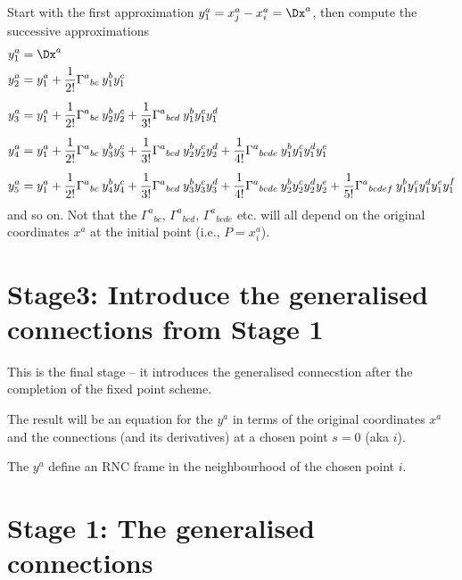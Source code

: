 \documentclass[12pt]{cdblatex}
\begin{document}
Start with the first approximation $y^a_1 = x^a_j-x^a_i = \Dx^a$, then compute the successive approximations
\begin{align*}
   y^a_1 &= \Dx^a\\
   y^a_2 &= y^a_1 + \frac{1}{2!}\Gamma^a{}_{bc}\>y^b_1 y^c_1\\[5pt]
   y^a_3 &= y^a_1 + \frac{1}{2!}\Gamma^a{}_{bc}\>y^b_2 y^c_2
                  + \frac{1}{3!}\Gamma^a{}_{bcd}\>y^b_1 y^c_1 y^d_1\\[5pt]
   y^a_4 &= y^a_1 + \frac{1}{2!}\Gamma^a{}_{bc}\>y^b_3 y^c_3
                  + \frac{1}{3!}\Gamma^a{}_{bcd}\>y^b_2 y^c_2 y^d_2
                  + \frac{1}{4!}\Gamma^a{}_{bcde}\>y^b_1 y^c_1 y^d_1 y^e_1\\[5pt]
   y^a_5 &= y^a_1 + \frac{1}{2!}\Gamma^a{}_{bc}\>y^b_4 y^c_4
                  + \frac{1}{3!}\Gamma^a{}_{bcd}\>y^b_3 y^c_3 y^d_3
                  + \frac{1}{4!}\Gamma^a{}_{bcde}\>y^b_2 y^c_2 y^d_2 y^e_2
                  + \frac{1}{5!}\Gamma^a{}_{bcdef}\>y^b_1 y^c_1 y^d_1 y^e_1 y^f_1
\end{align*}
and so on. Not that the $\Gamma^a{}_{bc}$, $\Gamma^a{}_{bcd}$, $\Gamma^a{}_{bcde}$ etc. will all
depend on the original coordinates $x^a$ at the initial point (i.e., $P=x^a_i$).

\section*{Stage3: Introduce the generalised connections from Stage 1}

This is the final stage -- it introduces the generalised connecstion after the
completion of the fixed point scheme.

The result will be an equation for the $y^a$ in terms of the original coordinates $x^a$ and the
connections (and its derivatives) at a chosen point $s=0$ (aka $i$).

The $y^a$ define an RNC frame in the neighbourhood of the chosen point $i$.

\clearpage

\section*{Stage 1: The generalised connections}
\end{document}
